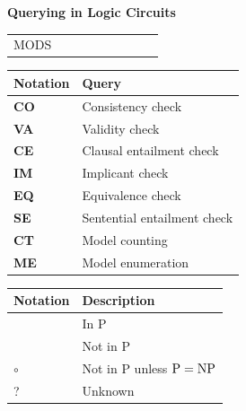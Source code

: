\documentclass[aspectratio=169]{beamer}
\newcommand{\cmark}{\color{rightgreen}\ding{51}}%
\newcommand{\xmark}{\color{wrongred}\ding{55}}%
\newcommand{\omark}{{\color{dark gray}\tiny$\bm{\circ}$}}%
\begin{document}
\begin{frame}[fragile]{\textbf{Querying in Logic Circuits}}
\begin{center}
\begin{minipage}{0.6\textwidth}
\begin{tabular}{l|cccccccc}
         MODS & \cmark & \cmark & \cmark & \cmark & \cmark & \cmark & \cmark & \cmark\\
    \end{tabular}
  \end{minipage}%
  \begin{minipage}{0.4\textwidth}
    \begin{tabular}{l|l}
      \textbf{Notation} & \textbf{Query}\\
      \hline
      \textbf{CO} & Consistency check\\
      \textbf{VA} & Validity check\\
      \textbf{CE} & Clausal entailment check\\
      \textbf{IM} & Implicant check\\
      \textbf{EQ} & Equivalence check\\
      \textbf{SE} & Sentential entailment check\\
      \textbf{CT} & Model counting\\
      \textbf{ME} & Model enumeration\\
    \end{tabular}

    \vspace{0.5cm}

    \begin{tabular}{l|l}
      \textbf{Notation} & \textbf{Description}\\
      \hline
      \cmark & In P\\
      \xmark & Not in P\\
      \omark & Not in P unless $\textup{P}=\textup{NP}$\\
      ? & Unknown\\
    \end{tabular}
  \end{minipage}
\end{center}

\vfill
\textcolor{dark gray}{\scriptsize\citep{darwiche02}}

\end{frame}

\end{document}
